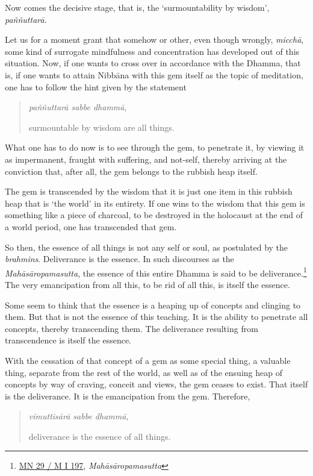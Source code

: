 Now comes the decisive stage, that is, the `surmountability by wisdom', \emph{paññuttarā}.

Let us for a moment grant that somehow or other, even though wrongly, \emph{micchā}, some kind of surrogate mindfulness and concentration has developed out of this situation. Now, if one wants to cross over in accordance with the Dhamma, that is, if one wants to attain Nibbāna with this gem itself as the topic of meditation, one has to follow the hint given by the statement

\begin{quote}
\emph{paññuttarā sabbe dhammā},

surmountable by wisdom are all things.
\end{quote}

What one has to do now is to see through the gem, to penetrate it, by viewing it as impermanent, fraught with suffering, and not-self, thereby arriving at the conviction that, after all, the gem belongs to the rubbish heap itself.

The gem is transcended by the wisdom that it is just one item in this rubbish heap that is `the world' in its entirety. If one wins to the wisdom that this gem is something like a piece of charcoal, to be destroyed in the holocaust at the end of a world period, one has transcended that gem.

So then, the essence of all things is not any self or soul, as postulated by the \emph{brahmins}. Deliverance is the essence. In such discourses as the \emph{Mahāsāropamasutta}, the essence of this entire Dhamma is said to be deliverance.\footnote{\href{https://suttacentral.net/mn29/pli/ms}{MN 29 / M I 197}, \emph{Mahāsāropamasutta}} The very emancipation from all this, to be rid of all this, is itself the essence.

Some seem to think that the essence is a heaping up of concepts and clinging to them. But that is not the essence of this teaching. It is the ability to penetrate all concepts, thereby transcending them. The deliverance resulting from transcendence is itself the essence.

With the cessation of that concept of a gem as some special thing, a valuable thing, separate from the rest of the world, as well as of the ensuing heap of concepts by way of craving, conceit and views, the gem ceases to exist. That itself is the deliverance. It is the emancipation from the gem. Therefore,

\begin{quote}
\emph{vimuttisārā sabbe dhammā,}

deliverance is the essence of all things.
\end{quote}

